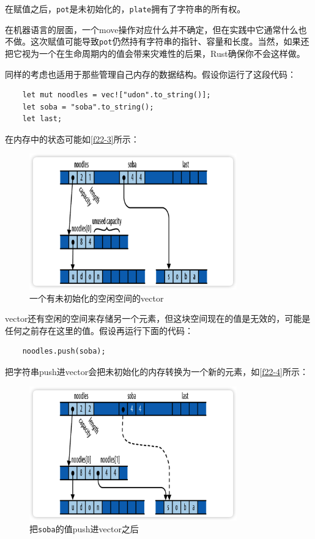 在赋值之后，\texttt{pot}是未初始化的，\texttt{plate}拥有了字符串的所有权。

在机器语言的层面，一个move操作对应什么并不确定，但在实践中它通常什么也不做。这次赋值可能导致\texttt{pot}仍然持有字符串的指针、容量和长度。当然，如果还把它视为一个在生命周期内的值会带来灾难性的后果，Rust确保你不会这样做。

同样的考虑也适用于那些管理自己内存的数据结构。假设你运行了这段代码：
\begin{verbatim}
    let mut noodles = vec!["udon".to_string()];
    let soba = "soba".to_string();
    let last;
\end{verbatim}

在内存中的状态可能如\autoref{f22-3}所示：

\begin{figure}[htbp]
    \centering
    \includegraphics[width=0.8\textwidth]{../img/f22-3.png}
    \caption{一个有未初始化的空闲空间的vector}
    \label{f22-3}
\end{figure}

vector还有空闲的空间来存储另一个元素，但这块空间现在的值是无效的，可能是任何之前存在这里的值。假设再运行下面的代码：
\begin{verbatim}
    noodles.push(soba);
\end{verbatim}

把字符串push进vector会把未初始化的内存转换为一个新的元素，如\autoref{f22-4}所示：
\begin{figure}[htbp]
    \centering
    \includegraphics[width=0.8\textwidth]{../img/f22-4.png}
    \caption{把\texttt{soba}的值push进vector之后}
    \label{f22-4}
\end{figure}

